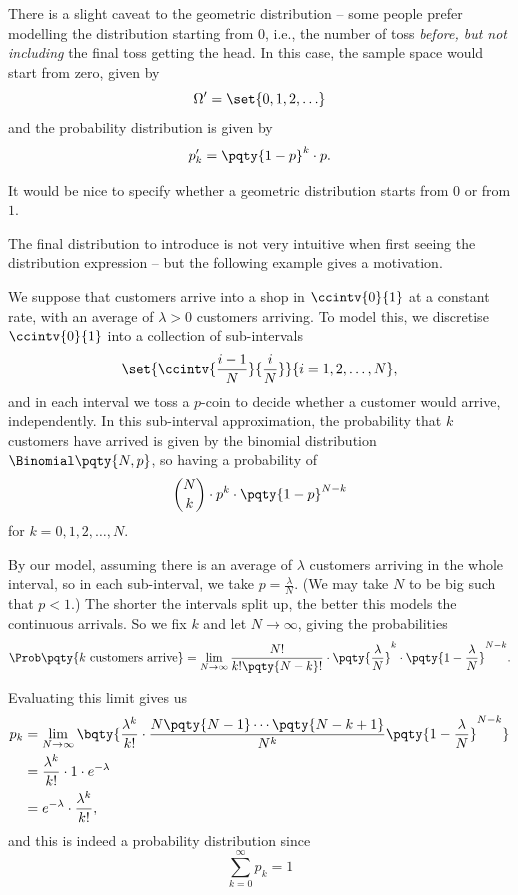 There is a slight caveat to the geometric distribution -- some people prefer modelling the distribution starting from \(0\), i.e., the number of toss \emph{before, but not including} the final toss getting the head. In this case, the sample space would start from zero, given by
\[
    \Omega' = \set{0, 1, 2, \ldots}
\]
and the probability distribution is given by
\[
    p'_k = \pqty{1 - p}^{k} \cdot p.
\]

It would be nice to specify whether a geometric distribution starts from \(0\) or from \(1\).

The final distribution to introduce is not very intuitive when first seeing the distribution expression -- but the following example gives a motivation.

\begin{example}
    We suppose that customers arrive into a shop in \(\ccintv{0}{1}\) at a constant rate, with an average of \(\lambda > 0\) customers arriving. To model this, we discretise \(\ccintv{0}{1}\) into a collection of sub-intervals
    \[
        \set{\ccintv{\frac{i - 1}{N}}{\frac{i}{N}}}{i = 1, 2, \ldots, N},
    \]
    and in each interval we toss a \(p\)-coin to decide whether a customer would arrive, independently. In this sub-interval approximation, the probability that \(k\) customers have arrived is given by the binomial distribution \(\Binomial\pqty{N, p}\), so having a probability of
    \[
        \binom{N}{k} \cdot p^k \cdot \pqty{1 - p}^{N - k}
    \]
    for \(k = 0, 1, 2, \ldots, N\).

    By our model, assuming there is an average of \(\lambda\) customers arriving in the whole interval, so in each sub-interval, we take \(p = \frac{\lambda}{N}\). (We may take \(N\) to be big such that \(p < 1\).) The shorter the intervals split up, the better this models the continuous arrivals. So we fix \(k\) and let \(N \to \infty\), giving the probabilities
    \[
        \Prob\pqty{k\text{ customers arrive}} = \lim_{N \to \infty} \frac{N!}{k! \pqty{N - k}!} \cdot \pqty{\frac{\lambda}{N}}^k \cdot \pqty{1 - \frac{\lambda}{N}}^{N - k}.
    \]

    Evaluating this limit gives us
    \begin{align*}
        p_k &= \lim_{N \to \infty} \bqty{\frac{\lambda^k}{k!} \cdot \frac{N \pqty{N - 1} \cdots \pqty{N - k + 1}}{N^k} \pqty{1 - \frac{\lambda}{N}}^{N - k}}\\
        &= \frac{\lambda^k}{k!} \cdot 1 \cdot e^{-\lambda} \\
        &= e^{-\lambda} \cdot \frac{\lambda^{k}}{k!},
    \end{align*}
    and this is indeed a probability distribution since
    \[
        \sum_{k = 0}^{\infty} p_k = 1
    \]
\end{example}

